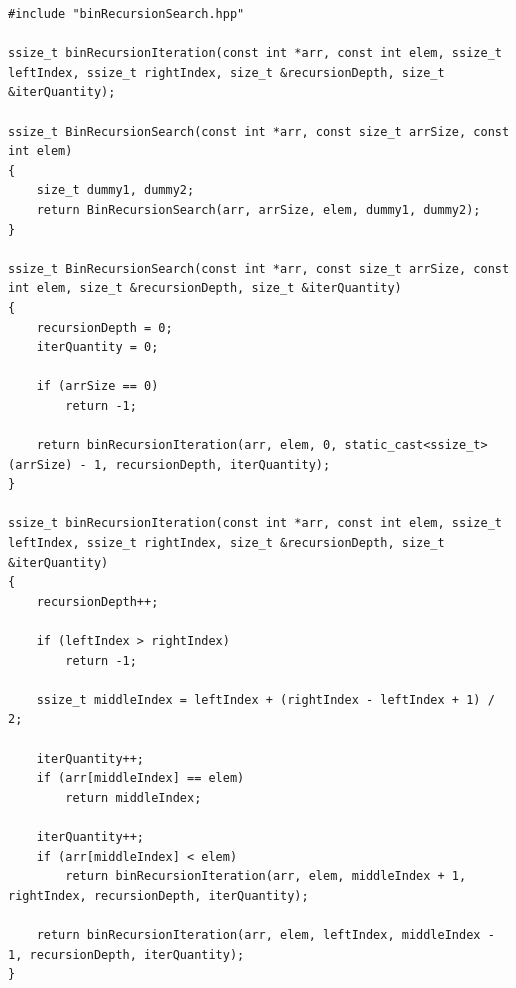 \begin{lstlisting}[style=cpp_listing, caption={Реализация алгоритма рекурсивного бинарного поиска}, label={lst:bin_recursion_search}]
#include "binRecursionSearch.hpp"

ssize_t binRecursionIteration(const int *arr, const int elem, ssize_t leftIndex, ssize_t rightIndex, size_t &recursionDepth, size_t &iterQuantity);

ssize_t BinRecursionSearch(const int *arr, const size_t arrSize, const int elem)
{
    size_t dummy1, dummy2;
    return BinRecursionSearch(arr, arrSize, elem, dummy1, dummy2);
}

ssize_t BinRecursionSearch(const int *arr, const size_t arrSize, const int elem, size_t &recursionDepth, size_t &iterQuantity)
{
    recursionDepth = 0;
    iterQuantity = 0;
    
    if (arrSize == 0)
        return -1;
    
    return binRecursionIteration(arr, elem, 0, static_cast<ssize_t>(arrSize) - 1, recursionDepth, iterQuantity);
}

ssize_t binRecursionIteration(const int *arr, const int elem, ssize_t leftIndex, ssize_t rightIndex, size_t &recursionDepth, size_t &iterQuantity)
{
    recursionDepth++;

    if (leftIndex > rightIndex)
        return -1;

    ssize_t middleIndex = leftIndex + (rightIndex - leftIndex + 1) / 2;

    iterQuantity++;
    if (arr[middleIndex] == elem)
        return middleIndex;

    iterQuantity++;
    if (arr[middleIndex] < elem)
        return binRecursionIteration(arr, elem, middleIndex + 1, rightIndex, recursionDepth, iterQuantity);
    
    return binRecursionIteration(arr, elem, leftIndex, middleIndex - 1, recursionDepth, iterQuantity);
}
\end{lstlisting}

